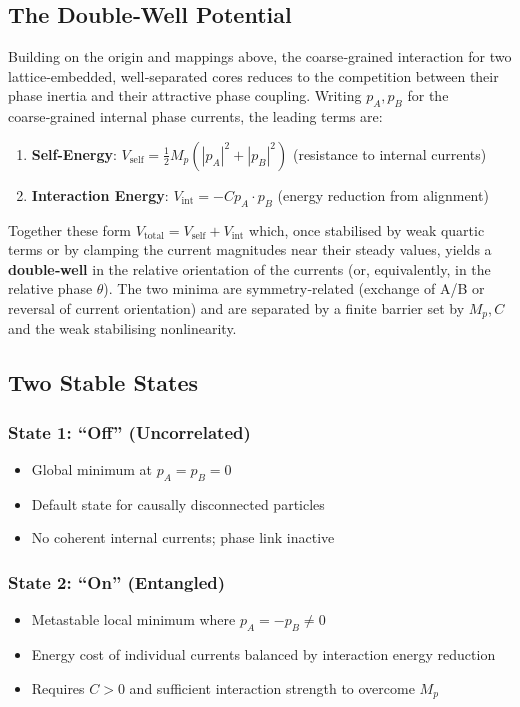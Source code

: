 \documentclass[11pt]{article}
\begin{document}
\subsection{The Double‑Well Potential}



Building on the origin and mappings above, the coarse‑grained interaction for two lattice‑embedded, well‑separated cores reduces to the competition between their phase inertia and their attractive phase coupling. Writing $p_A, p_B$ for the coarse‑grained internal phase currents, the leading terms are:
\begin{enumerate}
\item \textbf{Self-Energy}: $V_{\text{self}} = \frac{1}{2}M_p(|p_A|^2 + |p_B|^2)$ (resistance to internal currents)
\item \textbf{Interaction Energy}: $V_{\text{int}} = -C p_A \cdot p_B$ (energy reduction from alignment)
\end{enumerate}

Together these form $V_{\text{total}} = V_{\text{self}} + V_{\text{int}}$ which, once stabilised by weak quartic terms or by clamping the current magnitudes near their steady values, yields a \textbf{double‑well} in the relative orientation of the currents (or, equivalently, in the relative phase $\theta$). The two minima are symmetry‑related (exchange of A/B or reversal of current orientation) and are separated by a finite barrier set by $M_p, C$ and the weak stabilising nonlinearity.

\subsection{Two Stable States}

\subsubsection{State 1: ``Off'' (Uncorrelated)}
\begin{itemize}
\item Global minimum at $p_A = p_B = 0$
\item Default state for causally disconnected particles
\item No coherent internal currents; phase link inactive
\end{itemize}

\subsubsection{State 2: ``On'' (Entangled)}
\begin{itemize}
\item Metastable local minimum where $p_A = -p_B \neq 0$
\item Energy cost of individual currents balanced by interaction energy reduction
\item Requires $C > 0$ and sufficient interaction strength to overcome $M_p$
\end{itemize}
\end{document}
